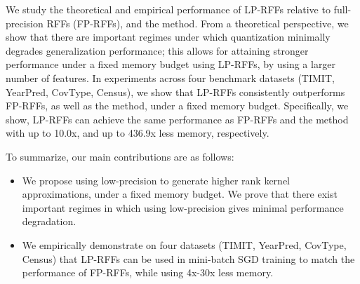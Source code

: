 

We study the theoretical and empirical performance of LP-RFFs relative to full-precision RFFs (FP-RFFs), and the \Nystrom method.  From a theoretical perspective, we show that there are important regimes under which quantization minimally degrades generalization performance; this allows for attaining stronger performance under a fixed memory budget using LP-RFFs, by using a larger number of features. In experiments across four benchmark datasets (TIMIT, YearPred, CovType, Census), we show that LP-RFFs consistently outperforms FP-RFFs, as well as the \Nystrom method, under a fixed memory budget. Specifically, we show, LP-RFFs can achieve the same performance as FP-RFFs and the \Nystrom method with up to 10.0x, and up to 436.9x less memory, respectively.

To summarize, our main contributions are as follows:
\begin{itemize}
	\item We propose using low-precision to generate higher rank kernel approximations, under a fixed memory budget. We prove that there exist important regimes in which using low-precision gives minimal performance degradation.
	\item We empirically demonstrate on four datasets (TIMIT, YearPred, CovType, Census) that LP-RFFs can be used in mini-batch SGD training to match the performance of FP-RFFs, while using 4x-30x less memory.
\end{itemize}

